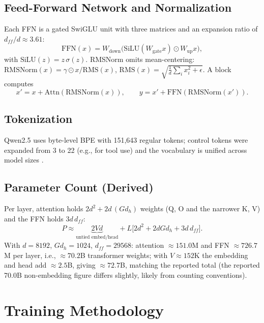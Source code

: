 \documentclass[conference]{IEEEtran}
\newcommand{\RMS}{\mathrm{RMS}}
\newcommand{\silu}{\mathrm{SiLU}}
\begin{document}
\subsection{Feed-Forward Network and Normalization}
Each FFN is a gated SwiGLU unit \cite{glu} with three matrices and an expansion ratio of $d_{ff}/d\approx 3.61$:
\begin{equation}
\mathrm{FFN}(x)=W_{\mathrm{down}}\big(\silu(W_{\mathrm{gate}}x)\odot W_{\mathrm{up}}x\big),
\end{equation}
with $\silu(z)=z\,\sigma(z)$. RMSNorm \cite{rmsnorm} omits mean-centering: $\mathrm{RMSNorm}(x)=\gamma\odot x/\RMS(x)$, $\RMS(x)=\sqrt{\tfrac1d\sum_i x_i^2+\epsilon}$. A block computes
\begin{equation}
x' = x+\mathrm{Attn}(\mathrm{RMSNorm}(x)),\qquad y = x'+\mathrm{FFN}(\mathrm{RMSNorm}(x')).
\end{equation}

\subsection{Tokenization}
Qwen2.5 uses byte-level BPE with 151,643 regular tokens; control tokens were expanded from 3 to 22 (e.g., for tool use) and the vocabulary is unified across model sizes \cite{qwen25}.

\subsection{Parameter Count (Derived)}
Per layer, attention holds $2d^2+2d\,(Gd_h)$ weights (Q, O and the narrower K, V) and the FFN holds $3d\,d_{ff}$:
\begin{equation}
P \approx \underbrace{2Vd}_{\text{untied embed/head}} + L\big[2d^2+2dGd_h+3d\,d_{ff}\big].
\end{equation}
With $d{=}8192$, $Gd_h{=}1024$, $d_{ff}{=}29568$: attention $\approx 151.0$M and FFN $\approx 726.7$M per layer, i.e., $\approx 70.2$B transformer weights; with $V\!\approx\!152$K the embedding and head add $\approx 2.5$B, giving $\approx 72.7$B, matching the reported total (the reported 70.0B non-embedding figure differs slightly, likely from counting conventions).

\section{Training Methodology}
\end{document}
